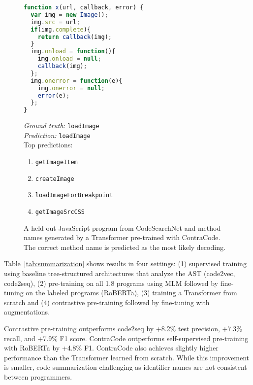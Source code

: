 \documentclass[11pt]{article}
\newcommand{\million}[0]{}
\newcommand{\ours}[0]{ContraCode}
\begin{document}
\begin{figure}
\begin{minipage}{0.5\linewidth}
\begin{footnotesize}
\begin{lstlisting}[language=JavaScript,basicstyle=\ttfamily\tiny]
function x(url, callback, error) {
  var img = new Image();
  img.src = url;
  if(img.complete){
    return callback(img);
  }
  img.onload = function(){
    img.onload = null;
    callback(img);
  };
  img.onerror = function(e){
    img.onerror = null;
    error(e);
  };
}	
\end{lstlisting}
\end{footnotesize}
\end{minipage}\hfill \begin{minipage}{0.5\linewidth}
\begin{small}
\textit{Ground truth}: \texttt{loadImage}\\
\textit{Prediction:} {\color{ForestGreen} \texttt{loadImage} }\\

Top predictions:
{\tiny
\begin{enumerate}
    \item \texttt{getImageItem}
    \item \texttt{createImage}
    \item \texttt{loadImageForBreakpoint}
    \item \texttt{getImageSrcCSS}
\end{enumerate}
}
\end{small}
\end{minipage}
\caption{A held-out JavaScript program from CodeSearchNet and method names generated by a Transformer pre-trained with \ours{}. The correct method name is predicted as the most likely decoding.}
\label{fig:qual_method_name}
\end{figure} 
Table~\ref{tab:summarization} shows results in four settings: (1) supervised training using baseline tree-structured architectures that analyze the AST (code2vec, code2seq), (2) pre-training on all 1.8\million{} programs using MLM followed by fine-tuning on the labeled programs (RoBERTa), (3) training a Transformer from scratch and (4) contrastive pre-training followed by fine-tuning with augmentations.

Contrastive pre-training outperforms code2seq by +8.2\% test precision, +7.3\% recall, and +7.9\% F1 score.
\ours{} outperforms self-supervised pre-training with RoBERTa by +4.8\% F1.
\ours{} also achieves slightly higher performance than the Transformer learned from scratch. While this improvement is smaller, code summarization challenging as identifier names are not consistent between programmers.
\end{document}
